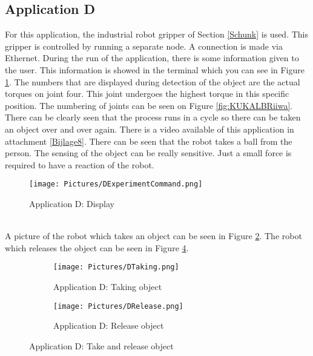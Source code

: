 \documentclass[11pt,a4paper]{report}
\begin{document}
\subsection{Application D}
For this application, the industrial robot gripper of Section \ref{Schunk} is used. This gripper is controlled by running a separate node. A connection is made via Ethernet. During the run of the application, there is some information given to the user. This information is showed in the terminal which you can see in Figure \ref{fig:DExperiment}. The numbers that are displayed during detection of the object are the actual torques on joint four. This joint undergoes the highest torque in this specific position. The numbering of joints can be seen on Figure \ref{fig:KUKALBRiiwa}. There can be clearly seen that the process runs in a cycle so there can be taken an object over and over again. There is a video available of this application in attachment \ref{Bijlage8}. There can be seen that the robot takes a ball from the person. The sensing of the object can be really sensitive. Just a small force is required to have a reaction of the robot.
\begin{figure}[!ht]
	\centering
	\texttt{[image: Pictures/DExperimentCommand.png]}
	\caption{Application D: Display}
	\label{fig:DExperiment}
\end{figure}
\\
A picture of the robot which takes an object can be seen in Figure \ref{fig:DTake}. The robot which releases the object can be seen in Figure \ref{fig:DRelease}.
\begin{figure}[!ht]
\begin{subfigure}{.5\textwidth}
	\centering
	\texttt{[image: Pictures/DTaking.png]}
	\caption{Application D: Taking object}
	\label{fig:DTake}
\end{subfigure}
\begin{subfigure}{.5\textwidth}
	\centering
	\texttt{[image: Pictures/DRelease.png]}
	\caption{Application D: Release object}
	\label{fig:DRelease}
\end{subfigure}
\caption{Application D: Take and release object}
\end{figure}
\newpage
\end{document}
